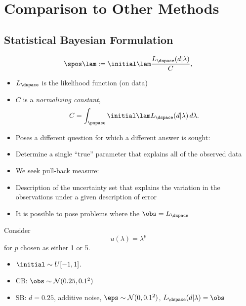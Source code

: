 \section{Comparison to Other Methods}
\subsection{Statistical Bayesian Formulation}
\begin{frame}[t]

\begin{equation}\label{eq:sb_post}
    \spos\lam := \initial\lam \frac{L_\dspace (d | \lambda)}{ C },
\end{equation}
\begin{itemize}

	\item <1-> $L_\dspace$ is the likelihood function (on data)
	\item <1-> $C$ is a \emph{normalizing constant},
	\[
		C = \int_\pspace \initial\lam L_\dspace(d | \lambda) \, d\lambda.
	\]
	\item <2-> Poses a different question for which a different answer is sought:
	\item <2-> Determine a single ``true'' parameter that explains all of the observed data \cite{Smith, Concrete, Complete}
	\item <3-> We seek pull-back measure:
	\item <3-> Description of the uncertainty set that explains the variation in the observations under a given description of error
	\item <4-> It is possible to pose problems where the $\obs = L_\dspace$

\end{itemize}

\end{frame}

\begin{frame}[t]
\begin{example}
Consider
\begin{equation}
u(\lambda) = \lambda^p
\end{equation}
for $p$ chosen as either 1 or 5. 

\begin{itemize}
	\item <1-> $\initial \sim U[-1,1]$. 
	\item <1-> CB: $\obs \sim \mathcal{N}(0.25,0.1^2)$
	\item <1-> SB: $d=0.25$, additive noise, $\eps \sim \mathcal{N}(0,0.1^2)$, $L_\dspace(d | \lambda) = \obs$
\end{itemize}
\end{example}
\end{frame}

